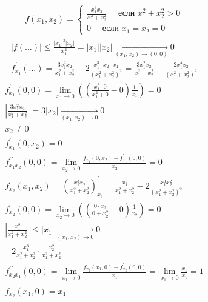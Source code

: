 \documentclass[main]{subfiles}
\begin{document}
    \begin{example}
        \begin{gather*}
            f(x_1,x_2) = \begin{cases}
                \frac{x_1^3x_2}{x_1^2 + x_2^2} \quad \text{ если    } x_1^2 + x_2^2 > 0\\
                0 \quad \text{ если } x_1 = x_2 = 0
            \end{cases} 
        \end{gather*}
        \begin{gather*}
            |f(\ldots)| \leq \frac{|x_1|^3|x_2|}{x_1^2} = |x_1||x_2| \underset{(x_1,x_2) \to (0,0)}{\longrightarrow} 0 \\
            f^\prime_{x_1} (\ldots) = \frac{3x_1^2x_2}{x_1^2+x_2^2} - 2\frac{x_1^3\cdot x_2 \cdot x_1}{(x_1^2+x_2^2)^2} = 
            \frac{3x_1^2x_2}{x_1^2+x_2^2} - \frac{2x_1^4x_2}{(x_1^2+x_2^2)^2} \end{gather*}
            \begin{gather*}
            f^\prime_{x_1}(0,0) = \underset{x_1 \to 0}{\lim} \left ( \left (\frac{x_1^3 \cdot 0}{x_1^2+0} - 0 \right ) \frac{1}{x_1} \right ) = 0\\
            \left | \frac{3x_1^2x_2}{x_1^2 + x_2^2} \right | = 3 |x_2| \underset{(x_1,x_2) \to 0}{\longrightarrow} 0\\
            x_2 \ne 0 \\
            f^\prime_{x_1}(0,x_2) = 0 \\
            f^{\prime\prime}_{x_1x_2}(0,0) = \underset{x_2 \to 0}{\lim} \frac{f^\prime_{x_1}(0,x_2)-f^\prime_{x_1}(0,0)}{x_2} = 0\\
            f^\prime_{x_2}(x_1,x_2) = \left ( \frac{x_1^3x_2}{x_1^2+x_2^2} \right )^\prime_{x_2} = \frac{x_1^3}{x_1^2+x_2^2} - 2\frac{x_1^3x_2^2}{(x_1^2+x_2^2)^2} \\
            f^\prime_{x_2}(0,0) = \underset{x_2 \to 0}{\lim} \left ( \left ( \frac{0 \cdot x_2}{0 + x_2^2} - 0 \right ) \frac{1}{x_2} \right ) = 0 \\
            \left | \frac{x_1^3}{x_1^2 + x_2^2} \right | \leq |x_1| \underset{(x_1,x_2) \to 0}{\longrightarrow} 0 \\
            -2 \frac{x_1^3}{x_1^2+x_2^2} \cdot \frac {x_2^2}{x_1^2+x_2^2} \\
            f^{\prime\prime}_{x_2x_1}(0,0) = \underset{x_1 \to 0}{ \lim} \frac{f^\prime_{x_2}(x_1,0)-f^\prime_{x_2}(0,0)}{x_1} = \underset{x_1 \to 0}{\lim} \frac{x_1}{x_1} = 1 \\
            f^\prime_{x_2}(x_1,0) = x_1\\
        \end{gather*}
    \end{example}
       
\end{document}
